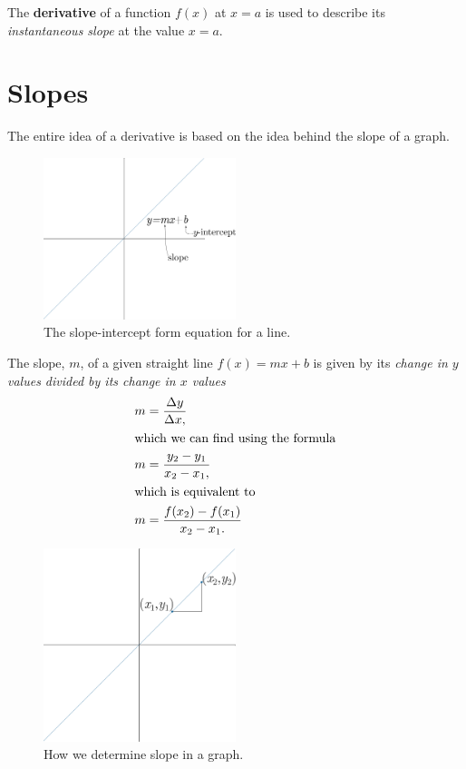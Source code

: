 The \textbf{derivative} of a function $f(x)$ at $x=a$ is used to describe its \emph{instantaneous slope} at the value $x=a$.

\section{Slopes}
The entire idea of a derivative is based on the idea behind the slope of a graph.
\begin{figure}[H]
  \begin{center}
    \includegraphics[width=0.5\textwidth]{continuous/derivatives/lineform.eps}
  \end{center}
  \caption{The slope-intercept form equation for a line.}
\end{figure}
The slope, $m$, of a given straight line
$f(x)=mx+b$
is given by its \emph{change in $y$ values divided by its change in $x$ values}
\begin{align}
  \label{eq:slope}
  m&=\frac{\Delta y}{\Delta x,} \\
  \intertext{which we can find using the formula}
  m&=\frac{y_2-y_1}{x_2-x_1,} \\
  \intertext{which is equivalent to}
  m&=\frac{f(x_2)-f(x_1)}{x_2-x_1.}
\end{align}
\begin{figure}[H]
  \begin{center}
    \includegraphics[width=0.5\textwidth]{continuous/derivatives/lineform_slope.eps}
  \end{center}
  \caption{How we determine slope in a graph.}
\end{figure}
